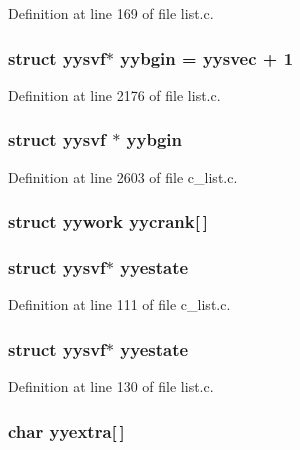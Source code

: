 Definition at line 169 of file list.c.
\subsubsection{\setlength{\rightskip}{0pt plus 5cm}struct \bf{yysvf}$\ast$ \bf{yybgin} = \bf{yysvec} + 1}\label{list_8c_53189c29d05a62c3bf9859c4219161a1}




Definition at line 2176 of file list.c.
\subsubsection{\setlength{\rightskip}{0pt plus 5cm}struct \bf{yysvf} $\ast$ \bf{yybgin}}\label{list_8c_6b7fc351a473ee81fd6c1d10a14c9491}




Definition at line 2603 of file c\_\-list.c.
\subsubsection{\setlength{\rightskip}{0pt plus 5cm}struct \bf{yywork}
 \bf{yycrank}[$\,$]}\label{list_8c_20ec935b8e234333e0a8e746c5022ba0}


\subsubsection{\setlength{\rightskip}{0pt plus 5cm}struct \bf{yysvf}$\ast$ \bf{yyestate}}\label{list_8c_8c65940e3c94c87a535845e35eb385f7}




Definition at line 111 of file c\_\-list.c.
\subsubsection{\setlength{\rightskip}{0pt plus 5cm}struct \bf{yysvf}$\ast$ \bf{yyestate}}\label{list_8c_8c65940e3c94c87a535845e35eb385f7}




Definition at line 130 of file list.c.
\subsubsection{\setlength{\rightskip}{0pt plus 5cm}char \bf{yyextra}[$\,$]}\label{list_8c_eb421468715aed80be580763fa9d99b8}


